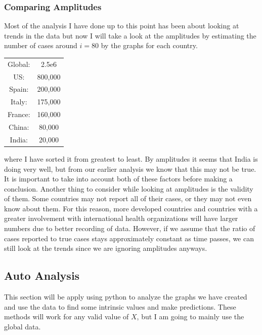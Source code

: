\documentclass{report}
\begin{document}
            \subsubsection{Comparing Amplitudes}
                Most of the analysis I have done up to this point has been about looking at trends in the data but now I will take a look at the amplitudes by estimating the number of cases around $i = 80$ by the graphs for each country.
                \begin{center}
                    \begin{tabular}{||c c||}
                        Global: & 2.5e6 \\
                        US: & 800,000 \\
                        Spain: & 200,000 \\
                        Italy: & 175,000 \\
                        France: & 160,000 \\
                        China: & 80,000 \\
                        India: & 20,000 \\
                    \end{tabular}
                \end{center}
                where I have sorted it from greatest to least. By amplitudes it seems that India is doing very well, but from our earlier analysis we know that this may not be true. It is important to take into account both of these factors before making a conclusion.
                \newline\indent
                Another thing to consider while looking at amplitudes is the validity of them. Some countries may not report all of their cases, or they may not even know about them. For this reason, more developed countries and countries with a greater involvement with international health organizations will have larger numbers due to better recording of data. However, if we assume that the ratio of cases reported to true cases stays approximately constant as time passes, we can still look at the trends since we are ignoring amplitudes anyways.
        \subsection{Auto Analysis}
        \label{sec:auto}
            This section will be apply using python to analyze the graphs we have created and use the data to find some intrinsic values and make predictions. These methods will work for any valid value of $X$, but I am going to mainly use the global data. 
\end{document}
